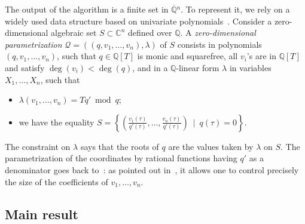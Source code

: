 \documentclass[a4paper]{article}
\def\scrQ{\ensuremath{\mathscr{Q}}}
\def\C{\mathbb{C}}
\def\Q{\mathbb{Q}}
\begin{document}
The output of the algorithm is a finite set in $\overline{\Q}{}^n$. To
represent it, we rely on a widely used data structure based on
univariate
polynomials~\cite{Kronecker82,Macaulay16,GiMo89,GiHeMoPa95,ABRW,GiHaHeMoMoPa97,GiHeMoMoPa98,Rouillier99}.
Consider a zero-dimensional algebraic set $S \subset \C^n$ defined
over $\Q$. A {\em zero-dimensional parametrization}
$\scrQ=((q,v_1,\dots,v_n),\lambda)$ of $S$ consists in polynomials
$(q,v_1,\dots,v_n)$, such that $q\in \Q[T]$ is monic and squarefree,
all $v_i$'s are in $\Q[T]$ and satisfy $\deg(v_i) < \deg(q)$, and in a
$\Q$-linear form $\lambda$ in variables $X_1,\dots,X_n$, such that
\begin{itemize}
\item $\lambda(v_1,\dots,v_n)=T q' \bmod q$;
\item we have the equality
  $S=\left \{\left(
      \frac{v_1(\tau)}{q'(\tau)},\dots,\frac{v_n(\tau)}{q'(\tau)}\right
    ) \ \mid \ q(\tau)=0 \right \}.$
\end{itemize}
The constraint on $\lambda$ says that the roots of $q$ are the values
taken by $\lambda$ on $S$. The parametrization of the coordinates by
rational functions having $q'$ as a denominator goes back
to~\cite{Kronecker82,Macaulay16}: as pointed out in~\cite{ABRW}, it
allows one to control precisely the size of the coefficients of
$v_1,\dots,v_n$.













\subsection{Main result} 
\end{document}
